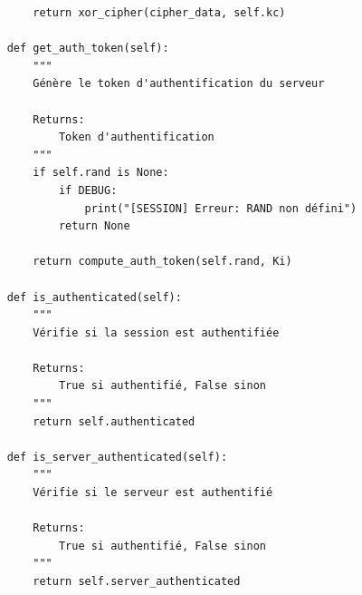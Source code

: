 \documentclass[12pt,a4paper]{report}
\begin{document}
\begin{verbatim}
        return xor_cipher(cipher_data, self.kc)
    
    def get_auth_token(self):
        """
        Génère le token d'authentification du serveur
        
        Returns:
            Token d'authentification
        """
        if self.rand is None:
            if DEBUG:
                print("[SESSION] Erreur: RAND non défini")
            return None
        
        return compute_auth_token(self.rand, Ki)
    
    def is_authenticated(self):
        """
        Vérifie si la session est authentifiée
        
        Returns:
            True si authentifié, False sinon
        """
        return self.authenticated
    
    def is_server_authenticated(self):
        """
        Vérifie si le serveur est authentifié
        
        Returns:
            True si authentifié, False sinon
        """
        return self.server_authenticated

\end{verbatim}
\end{document}
